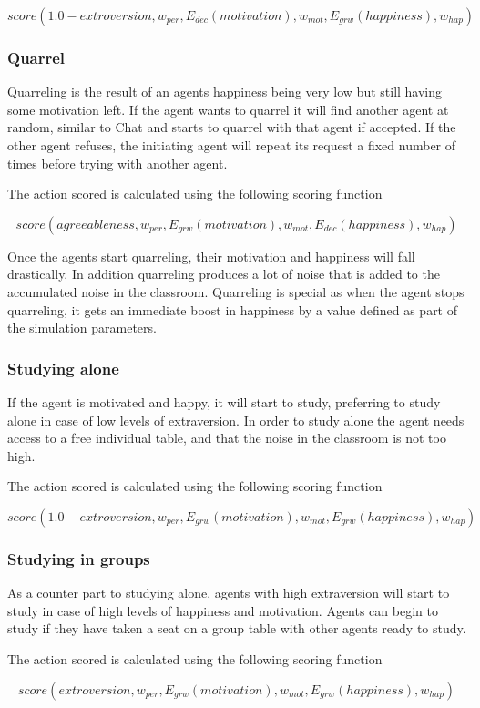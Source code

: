 \begin{equation}
    score(1.0 - extroversion, w_{per}, E_{dec}(motivation), w_{mot}, E_{grw}(happiness), w_{hap})
\end{equation}

\subsubsection{Quarrel}
Quarreling is the result of an agents happiness being very low but still having
some motivation left. If the agent wants to quarrel it will find another agent
at random, similar to Chat and starts to quarrel with that agent if accepted.
If the other agent refuses, the initiating agent will repeat its request a fixed
number of times before trying with another agent.

The action scored is calculated using the following scoring function

\begin{equation}
    score(agreeableness, w_{per}, E_{grw}(motivation), w_{mot}, E_{dec}(happiness), w_{hap})
\end{equation}

Once the agents start quarreling, their motivation and happiness will fall drastically.
In addition quarreling produces a lot of noise that is added to the accumulated
noise in the classroom.
Quarreling is special as when the agent stops quarreling, it gets an immediate
boost in happiness by a value defined as part of the simulation parameters.

\subsubsection{Studying alone}
If the agent is motivated and happy, it will start to study, preferring
to study alone in case of low levels of extraversion.
In order to study alone the agent needs access to a free individual table, and that
the noise in the classroom is not too high.

The action scored is calculated using the following scoring function

\begin{equation}
    score(1.0 - extroversion, w_{per}, E_{grw}(motivation), w_{mot}, E_{grw}(happiness), w_{hap})
\end{equation}

\subsubsection{Studying in groups}
As a counter part to studying alone, agents with high extraversion will start
to study in case of high levels of happiness and motivation. Agents can begin
to study if they have taken a seat on a group table with other agents ready to study.

The action scored is calculated using the following scoring function

\begin{equation}
    score(extroversion, w_{per}, E_{grw}(motivation), w_{mot}, E_{grw}(happiness), w_{hap})
\end{equation}
